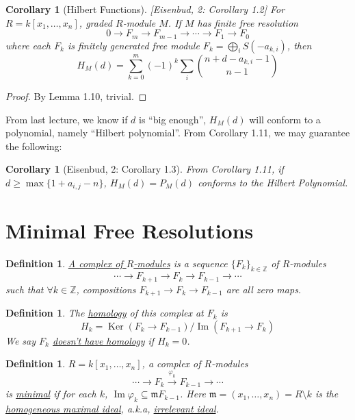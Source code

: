 \documentclass[11pt]{article}
\DeclareMathOperator{\Ker}{Ker}
\DeclareMathOperator{\ImOp}{Im} %
\newtheorem{definition}[theorem]{Definition}
\newtheorem{corollary}[theorem]{Corollary}
\begin{document}
\begin{corollary}[Hilbert Functions] [Eisenbud, 2: Corollary 1.2]
    For $R = k[x_1, \dots, x_n]$, graded $R$-module $M$. If $M$ has finite free resolution
    $$ 0 \to F_m \to F_{m-1} \to \cdots \to F_1 \to F_0 $$
    where each $F_k$ is finitely generated free module $F_k = \bigoplus_i S(-a_{k,i})$, then
    $$ H_M(d) = \sum_{k=0}^m (-1)^k \sum_i \binom{n+d-a_{k,i}-1}{n-1} $$
\end{corollary}
\begin{proof}
    By Lemma 1.10, trivial.
\end{proof}

From last lecture, we know if $d$ is ``big enough'', $H_M(d)$ will conform to a polynomial, namely ``Hilbert polynomial''.
From Corollary 1.11, we may guarantee the following:

\begin{corollary}[Eisenbud, 2: Corollary 1.3]
    From Corollary 1.11, if $d \ge \max\{1 + a_{i,j} - n\}$, $H_M(d) = P_M(d)$ conforms to the Hilbert Polynomial.
\end{corollary}

\section{Minimal Free Resolutions}

\begin{definition}
    \underline{A complex of $R$-modules} is a sequence $\{F_k\}_{k \in \mathbb{Z}}$ of $R$-modules
    $$ \cdots \to F_{k+1} \to F_k \to F_{k-1} \to \cdots $$
    such that $\forall k \in \mathbb{Z}$, compositions $F_{k+1} \to F_k \to F_{k-1}$ are all zero maps.
\end{definition}

\begin{definition}
    The \underline{homology} of this complex at $F_k$ is
    $$ H_k = \Ker(F_k \to F_{k-1}) / \ImOp(F_{k+1} \to F_k) $$
    We say $F_k$ \underline{doesn't have homology} if $H_k = 0$.
\end{definition}

\begin{definition}
    $R = k[x_1, \dots, x_n]$, a complex of $R$-modules
    $$ \cdots \to F_k \xrightarrow{\varphi_k} F_{k-1} \to \cdots $$
    is \underline{minimal} if for each $k$, $\ImOp \varphi_k \subseteq \mathfrak{m} F_{k-1}$.
    Here $\mathfrak{m} = (x_1, \dots, x_n) = R \setminus k$ is the \underline{homogeneous maximal ideal}, a.k.a, \underline{irrelevant ideal}.
\end{definition}
\end{document}
